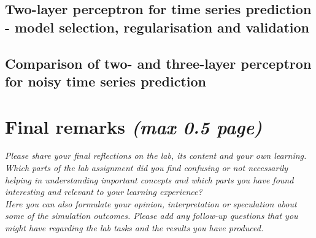\documentclass[a4paper]{article}
\begin{document}
\subsection{Two-layer perceptron for time series prediction - model selection, regularisation and validation}

\subsection{Comparison of two- and three-layer perceptron for noisy time series prediction}

\section{Final remarks \normalsize{\textit{(max 0.5 page)}}}
\textit{Please share your final reflections on the lab, its content and your own learning. Which parts of the lab assignment did you find confusing or not necessarily helping in understanding important concepts and which parts you have found interesting and relevant to your learning experience? \\
Here you can also formulate your opinion, interpretation or speculation about some of the simulation outcomes. Please add any follow-up questions that you might have regarding the lab tasks and the results you have produced.}
\end{document}
